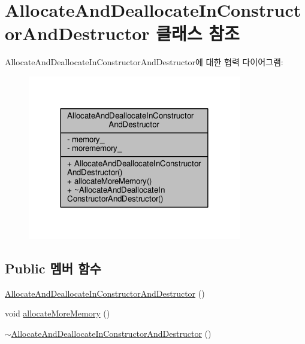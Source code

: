 \hypertarget{class_allocate_and_deallocate_in_constructor_and_destructor}{}\section{Allocate\+And\+Deallocate\+In\+Constructor\+And\+Destructor 클래스 참조}
\label{class_allocate_and_deallocate_in_constructor_and_destructor}


Allocate\+And\+Deallocate\+In\+Constructor\+And\+Destructor에 대한 협력 다이어그램\+:
\nopagebreak
\begin{figure}[H]
\begin{center}
\leavevmode
\includegraphics[width=264pt]{class_allocate_and_deallocate_in_constructor_and_destructor__coll__graph}
\end{center}
\end{figure}
\subsection*{Public 멤버 함수}
\begin{DoxyCompactItemize}
\item 
\hyperlink{class_allocate_and_deallocate_in_constructor_and_destructor_a732f0ad6dcba42d2ba5ffed428d03860}{Allocate\+And\+Deallocate\+In\+Constructor\+And\+Destructor} ()
\item 
void \hyperlink{class_allocate_and_deallocate_in_constructor_and_destructor_a2471fbe16617db97f4884ca78cf17113}{allocate\+More\+Memory} ()
\item 
\hyperlink{class_allocate_and_deallocate_in_constructor_and_destructor_a226b6f86d07c7b1a95426b56e8bdc02c}{$\sim$\+Allocate\+And\+Deallocate\+In\+Constructor\+And\+Destructor} ()
\end{DoxyCompactItemize}
